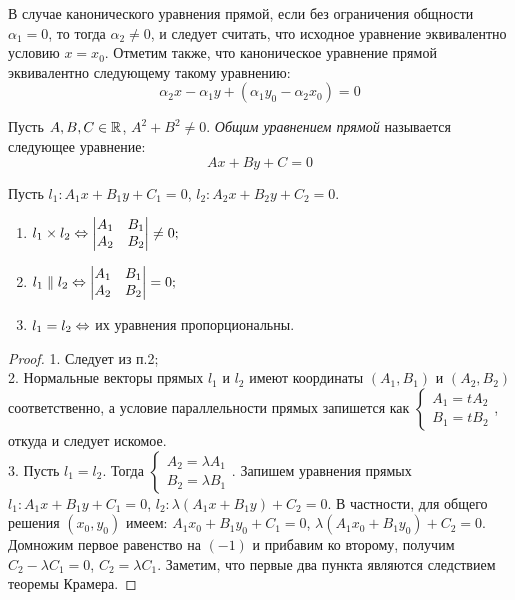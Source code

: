     \begin{note}
    	В случае канонического уравнения прямой, если без ограничения общности $\alpha_1 = 0$, то тогда $\alpha_2 \ne 0$, и следует считать, что исходное уравнение эквивалентно условию $x = x_0$. Отметим также, что каноническое уравнение прямой эквивалентно следующему такому уравнению:
    	\[\alpha_2 x - \alpha_1 y + (\alpha_1 y_0 - \alpha_2 x_0) = 0\]
    \end{note}
    
    \begin{definition}
    	Пусть $A, B, C \in \mathbb{R}$, $A^2+B^2 \ne 0$. \textit{Общим уравнением прямой} называется следующее уравнение:
    	\[Ax+By+C = 0\]
    \end{definition}
    
    \begin{theorem}
        Пусть $l_{1}: A_{1}x + B_{1}y + C_{1} = 0$, $l_{2}: A_{2}x + B_{2}y + C_{2} = 0$. 
        \begin{enumerate}
            \item $l_1 \times l_2 \Leftrightarrow \begin{vmatrix}
                A_1 & B_1 \\
                A_2 & B_2
            \end{vmatrix} \neq 0;$
            \item $l_1 \parallel l_2 \Leftrightarrow \begin{vmatrix}
                A_1 & B_1 \\
                A_2 & B_2
            \end{vmatrix} = 0;$
            \item $l_1 = l_2 \Leftrightarrow$ их уравнения пропорциональны.
        \end{enumerate}
    \end{theorem}
    
    \begin{proof}
        1. Следует из п.2;\\
        2. Нормальные векторы прямых $l_1$ и $l_2$ имеют координаты $(A_1,B_1)$ и $(A_2, B_2)$ соответственно, а условие параллельности прямых запишется как $\begin{cases}
            A_1 = t A_2\\
            B_1 = t B_2
        \end{cases}$, откуда и следует искомое.\\
        3. Пусть $l_1 = l_2$. Тогда $\begin{cases}
            A_2 = \lambda A_1\\
            B_2 = \lambda B_1
        \end{cases}$. Запишем уравнения прямых $l_1: A_{1}x + B_{1}y + C_1 = 0$, $l_2: \lambda(A_{1}x + B_{1}y) + C_2 = 0$. В частности, для общего решения $(x_{0}, y_{0})$ имеем: $A_{1}x_{0} + B_{1}y_{0} + C_1 = 0$, $\lambda(A_{1}x_{0} + B_{1}y_{0}) + C_2 = 0$. Домножим первое равенство на $(-1)$ и прибавим ко второму, получим $C_2 - \lambda C_1 = 0$, $C_2 = \lambda C_1$.
        Заметим, что первые два пункта являются следствием теоремы Крамера.
    \end{proof}
    
